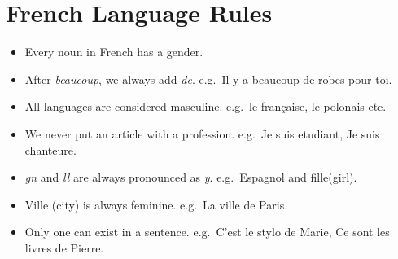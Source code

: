 \section{French Language Rules}

\begin{itemize}

\item{Every noun in French has a gender.}

\item{After \emph{beaucoup}, we always add \emph{de}. e.g.\ Il y a beaucoup de
robes pour toi.}

\item{All languages are considered masculine. e.g.\ le fran\c{c}aise, le polonais
etc.}

\item{We never put an article with a profession. e.g.\ Je suis etudiant, Je suis chanteure.}

\item{\emph{gn} and \emph{ll} are always pronounced as \emph{y}. e.g.\ Espagnol and fille(girl).}

\item{Ville (city) is always feminine. e.g.\ La ville de Paris.}

\item{Only one can exist in a sentence. e.g.\ C'est le stylo de Marie, Ce sont les livres de Pierre.}

\end{itemize}
